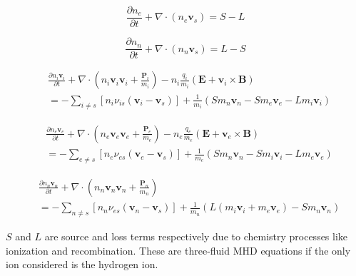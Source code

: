 \documentclass[12pt,upcase]{umlthesis}
\begin{document}
\begin{equation}\label{eq:econtinuity}
	\frac{\partial n_e}{\partial t} + \nabla \cdot (n_e \textbf{v}_s) = S - L
\end{equation}

\begin{equation}\label{eq:ncontinuity}
	\frac{\partial n_n}{\partial t} + \nabla \cdot (n_n \textbf{v}_s) = L - S
\end{equation}

\begin{equation}\label{eq:imomentum}
	\begin{aligned}
	& \frac{\partial n_i \textbf{v}_i}{\partial t} + \nabla \cdot (n_i \textbf{v}_i \textbf{v}_i + \frac{\textbf{P}_i}{m_i} ) - n_i \frac{q_i}{m_i}(\textbf{E} + \textbf{v}_i \times \textbf{B}) \\
	& = - \sum_{i \neq s} [n_i \nu_{is}(\textbf{v}_i - \textbf{v}_s)] + \frac{1}{m_i} (S m_n \textbf{v}_n - S m_e \textbf{v}_e -L m_i \textbf{v}_i)
\end{aligned}
\end{equation}

\begin{equation}\label{eq:emomentum}
	\begin{aligned}
	& \frac{\partial n_e \textbf{v}_e}{\partial t} + \nabla \cdot (n_e \textbf{v}_e \textbf{v}_e + \frac{\textbf{P}_e}{m_e} ) - n_e \frac{q_e}{m_e}(\textbf{E} + \textbf{v}_e \times \textbf{B}) \\
	& = - \sum_{e \neq s} [n_e \nu_{es}(\textbf{v}_e - \textbf{v}_s)] + \frac{1}{m_e} (S m_n \textbf{v}_n - S m_i \textbf{v}_i - L m_e \textbf{v}_e)
\end{aligned}
\end{equation}

\begin{equation}\label{eq:nmomentum}
	\begin{aligned}
	& \frac{\partial n_n \textbf{v}_n}{\partial t} + \nabla \cdot (n_n \textbf{v}_n \textbf{v}_n + \frac{\textbf{P}_n}{m_n} ) \\
	& = - \sum_{n \neq s} [n_n \nu_{es}(\textbf{v}_n - \textbf{v}_s)] + \frac{1}{m_n} (L(m_i\textbf{v}_i+m_e\textbf{v}_e) -S m_n \textbf{v}_n)
\end{aligned}
\end{equation}

$S$ and $L$ are source and loss terms respectively due to chemistry processes like ionization and recombination. These are three-fluid MHD equations if the only ion considered is the hydrogen ion.
\end{document}
